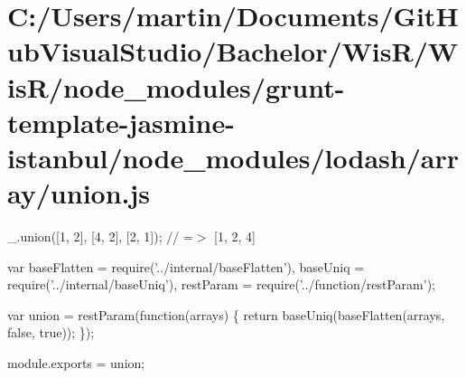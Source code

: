 \hypertarget{_c_1_2_users_2martin_2_documents_2_git_hub_visual_studio_2_bachelor_2_wis_r_2_wis_r_2node_module1b58692789d2d8152ac823357bccfea3}{}\section{C\+:/\+Users/martin/\+Documents/\+Git\+Hub\+Visual\+Studio/\+Bachelor/\+Wis\+R/\+Wis\+R/node\+\_\+modules/grunt-\/template-\/jasmine-\/istanbul/node\+\_\+modules/lodash/array/union.\+js}
\+\_\+.\+union(\mbox{[}1, 2\mbox{]}, \mbox{[}4, 2\mbox{]}, \mbox{[}2, 1\mbox{]}); // =$>$ \mbox{[}1, 2, 4\mbox{]}


\begin{DoxyCodeInclude}
var baseFlatten = require(\textcolor{stringliteral}{'../internal/baseFlatten'}),
    baseUniq = require(\textcolor{stringliteral}{'../internal/baseUniq'}),
    restParam = require(\textcolor{stringliteral}{'../function/restParam'});

var \textcolor{keyword}{union }= restParam(function(arrays) \{
  \textcolor{keywordflow}{return} baseUniq(baseFlatten(arrays, \textcolor{keyword}{false}, \textcolor{keyword}{true}));
\});

module.exports = \textcolor{keyword}{union};
\end{DoxyCodeInclude}
 
